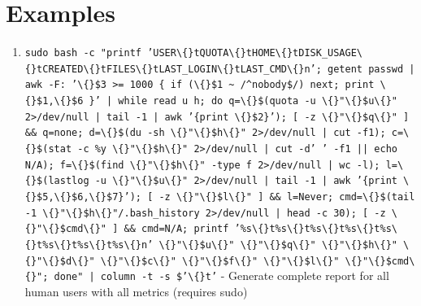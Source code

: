 \documentclass[openany]{book}
\begin{document}
\section*{Examples}
\begin{enumerate}
  \item \texttt{sudo bash -c "printf 'USER\textbackslash\{\}tQUOTA\textbackslash\{\}tHOME\textbackslash\{\}tDISK\_USAGE\textbackslash\{\}tCREATED\textbackslash\{\}tFILES\textbackslash\{\}tLAST\_LOGIN\textbackslash\{\}tLAST\_CMD\textbackslash\{\}n'; getent passwd | awk -F: '\textbackslash\{\}\$3 >= 1000 \{ if (\textbackslash\{\}\$1 \textasciitilde{} /\textasciicircum{}nobody\$/) next; print \textbackslash\{\}\$1,\textbackslash\{\}\$6 \}' | while read u h; do q=\textbackslash\{\}\$(quota -u \textbackslash\{\}"\textbackslash\{\}\$u\textbackslash\{\}" 2>/dev/null | tail -1 | awk '\{print \textbackslash\{\}\$2\}'); [ -z \textbackslash\{\}"\textbackslash\{\}\$q\textbackslash\{\}" ] \&\& q=none; d=\textbackslash\{\}\$(du -sh \textbackslash\{\}"\textbackslash\{\}\$h\textbackslash\{\}" 2>/dev/null | cut -f1); c=\textbackslash\{\}\$(stat -c \%y \textbackslash\{\}"\textbackslash\{\}\$h\textbackslash\{\}" 2>/dev/null | cut -d' ' -f1 || echo N/A); f=\textbackslash\{\}\$(find \textbackslash\{\}"\textbackslash\{\}\$h\textbackslash\{\}" -type f 2>/dev/null | wc -l); l=\textbackslash\{\}\$(lastlog -u \textbackslash\{\}"\textbackslash\{\}\$u\textbackslash\{\}" 2>/dev/null | tail -1 | awk '\{print \textbackslash\{\}\$5,\textbackslash\{\}\$6,\textbackslash\{\}\$7\}'); [ -z \textbackslash\{\}"\textbackslash\{\}\$l\textbackslash\{\}" ] \&\& l=Never; cmd=\textbackslash\{\}\$(tail -1 \textbackslash\{\}"\textbackslash\{\}\$h\textbackslash\{\}"/.bash\_history 2>/dev/null | head -c 30); [ -z \textbackslash\{\}"\textbackslash\{\}\$cmd\textbackslash\{\}" ] \&\& cmd=N/A; printf '\%s\textbackslash\{\}t\%s\textbackslash\{\}t\%s\textbackslash\{\}t\%s\textbackslash\{\}t\%s\textbackslash\{\}t\%s\textbackslash\{\}t\%s\textbackslash\{\}t\%s\textbackslash\{\}n' \textbackslash\{\}"\textbackslash\{\}\$u\textbackslash\{\}" \textbackslash\{\}"\textbackslash\{\}\$q\textbackslash\{\}" \textbackslash\{\}"\textbackslash\{\}\$h\textbackslash\{\}" \textbackslash\{\}"\textbackslash\{\}\$d\textbackslash\{\}" \textbackslash\{\}"\textbackslash\{\}\$c\textbackslash\{\}" \textbackslash\{\}"\textbackslash\{\}\$f\textbackslash\{\}" \textbackslash\{\}"\textbackslash\{\}\$l\textbackslash\{\}" \textbackslash\{\}"\textbackslash\{\}\$cmd\textbackslash\{\}"; done" | column -t -s \$'\textbackslash\{\}t'} - Generate complete report for all human users with all metrics (requires sudo)

\end{enumerate}
\end{document}
